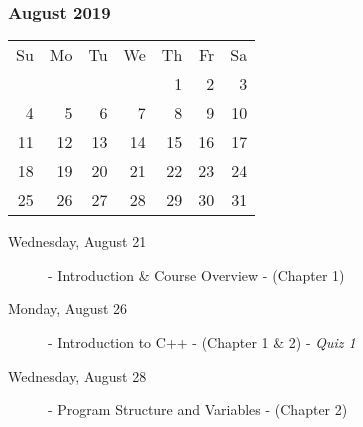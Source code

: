 \subsubsection*{August 2019}
\begin{tabular}{rrrrrrr}
Su & Mo & Tu & We & Th & Fr & Sa\\
   &    &    &    &  1 &  2 &  3\\
 4 &  5 &  6 &  7 &  8 &  9 & 10\\
11 & 12 & 13 & 14 & 15 & 16 & 17\\
18 & 19 & 20 & 21 & 22 & 23 & 24\\
25 & 26 & 27 & 28 & 29 & 30 & 31\\
\end{tabular}

\begin{description}
\item[Wednesday, August 21] 
  - Introduction \& Course Overview
  \newline- (Chapter 1)
\item[Monday, August 26] 
  - Introduction to C++
  \newline- (Chapter 1 \& 2)
  \newline- {\em Quiz 1}
\item[Wednesday, August 28] 
  - Program Structure and Variables
  \newline- (Chapter 2) 
\end{description}
\hrulefill

